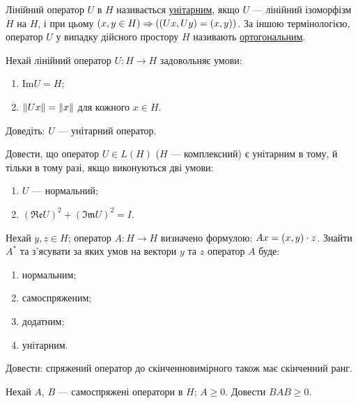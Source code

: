 \begin{theory}
    Лінійний оператор $U$ в $H$ називається \uline{унітарним}, якщо
    $U$ --- лінійний ізоморфізм $H$ на $H$, і при цьому $(x, y \in H) \Rightarrow 
    \left(\left(Ux, Uy\right) = \left(x, y\right)\right)$. За іншою термінологією, оператор
    $U$ у випадку дійсного простору $H$ називають \uline{ортогональним}.
\end{theory}

\begin{exercise}
    Нехай лінійний оператор $U:H \to H$ задовольняє умови:
    \begin{enumerate}[label=\ukr*)]
        \item $\mathrm{Im}U = H$;
        \item $\left\lVert Ux\right\rVert = \left\lVert x\right\rVert$ для кожного $x \in H$.
    \end{enumerate}
    Доведіть: $U$ --- унітарний оператор.
\end{exercise}

\begin{exercise}
    Довести, що оператор $U \in L(H)$ ($H$ --- комплексний) є унітарним в тому,
    й тільки в тому разі, якщо виконуються дві умови:
    \begin{enumerate}[label=\ukr*)]
        \item $U$ --- нормальний;
        \item $(\mathfrak{Re}U)^2 + (\mathfrak{Im}U)^2 = I$.
    \end{enumerate}
\end{exercise}

\begin{exercise}
    Нехай $y, z \in H$; оператор $A: H \to H$ визначено формулою: $Ax = \left(x, y\right) \cdot z$.
    Знайти $A^*$ та з'ясувати за яких умов на вектори $y$ та $z$ оператор $A$ буде:
    \begin{enumerate}[label=\ukr*)]
        \item нормальним;
        \item самоспряженим;
        \item додатним;
        \item унітарним.
    \end{enumerate}
\end{exercise}

\begin{exercise}
    Довести: спряжений оператор до скінченновимірного також має скінченний ранг.
\end{exercise}

\begin{exercise}
    Нехай $A$, $B$ --- самоспряжені оператори в $H$; $A \geq 0$.
    Довести $BAB \geq 0$.
\end{exercise}